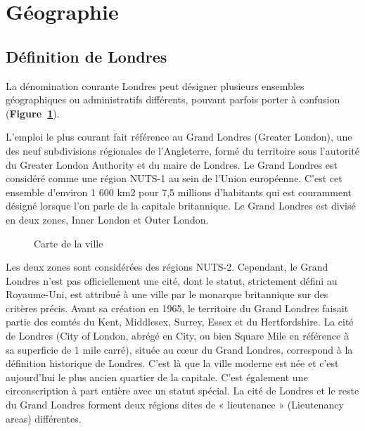 \documentclass{article}
\begin{document}

\newpage


\section{Géographie}
\subsection{Définition de Londres}

La dénomination courante Londres peut désigner plusieurs ensembles géographiques ou administratifs différents, pouvant parfois porter à confusion (\textbf{Figure~\ref{fig:geo1}}).

L'emploi le plus courant fait référence au Grand Londres (Greater London), une des neuf subdivisions régionales de l'Angleterre, formé du territoire sous l'autorité du Greater London Authority et du maire de Londres. Le Grand Londres est considéré comme une région NUTS-1 au sein de l'Union européenne. C'est cet ensemble d'environ 1 600 km2 pour 7,5 millions d'habitants qui est couramment désigné lorsque l'on parle de la capitale britannique. Le Grand Londres est divisé en deux zones, Inner London et Outer London. 
\begin{figure}
\centering
{}
\caption{Carte de la ville}
\label{fig:geo1}
\end{figure}
Les deux zones sont considérées des régions NUTS-2. Cependant, le Grand Londres n'est pas officiellement une cité, dont le statut, strictement défini au Royaume-Uni, est attribué à une ville par le monarque britannique sur des critères précis. Avant sa création en 1965, le territoire du Grand Londres faisait partie des comtés du Kent, Middlesex, Surrey, Essex et du Hertfordshire.
La cité de Londres (City of London, abrégé en City, ou bien Square Mile en référence à sa superficie de 1 mile carré), située au cœur du Grand Londres, correspond à la définition historique de Londres. C'est là que la ville moderne est née et c'est aujourd'hui le plus ancien quartier de la capitale. C'est également une circonscription à part entière avec un statut spécial. La cité de Londres et le reste du Grand Londres forment deux régions dites de « lieutenance » (Lieutenancy areas) différentes.
\end{document}
